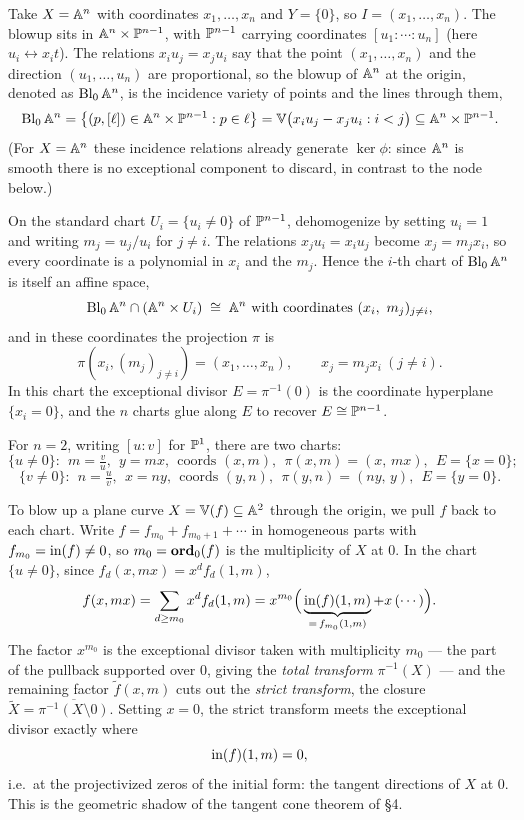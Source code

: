 \documentclass[11pt]{article}
\begin{document}
Take $X = \A^n$ with coordinates $x_1, \ldots, x_n$ and $Y = \{0\}$, so $I = (x_1, \ldots, x_n)$. The blowup sits in $\A^n \times \P^{n-1}$, with $\P^{n-1}$ carrying coordinates $[u_1 : \cdots : u_n]$ (here $u_i \leftrightarrow x_i t$). The relations $x_i u_j = x_j u_i$ say that the point $(x_1, \ldots, x_n)$ and the direction $(u_1, \ldots, u_n)$ are proportional, so the blowup of $\A^n$ at the origin, denoted as $\Bl_0 \A^n$, is the incidence variety of points and the lines through them,
\[\Bl_0 \A^n = \big\{(p, [\ell]) \in \A^n \times \P^{n-1} : p \in \ell\big\} = \V\big(x_i u_j - x_j u_i : i < j\big) \subseteq \A^n \times \P^{n-1}.\]
(For $X = \A^n$ these incidence relations already generate $\ker\phi$: since $\A^n$ is smooth there is no exceptional component to discard, in contrast to the node below.)
 
\begin{definition}\label{def:charts}
On the standard chart $U_i = \{u_i \neq 0\}$ of $\P^{n-1}$, dehomogenize by setting $u_i = 1$ and writing $m_j = u_j / u_i$ for $j \neq i$. The relations $x_j u_i = x_i u_j$ become $x_j = m_j x_i$, so every coordinate is a polynomial in $x_i$ and the $m_j$. Hence the $i$-th chart of $\Bl_0 \A^n$ is itself an affine space,
\[\Bl_0 \A^n \cap (\A^n \times U_i) \;\iso\; \A^n \text{ with coordinates } (x_i,\ m_j)_{j \neq i},\]
and in these coordinates the projection $\pi$ is
\[\pi(x_i, (m_j)_{j \neq i}) = (x_1, \ldots, x_n), \qquad x_j = m_j x_i \ (j \neq i).\]
In this chart the exceptional divisor $E = \pi^{-1}(0)$ is the coordinate hyperplane $\{x_i = 0\}$, and the $n$ charts glue along $E$ to recover $E \iso \P^{n-1}$.
\end{definition}
 
For $n = 2$, writing $[u:v]$ for $\P^1$, there are two charts:
\[
\{u \neq 0\}:\ \ m = \tfrac{v}{u},\ \ y = mx,\ \ \text{coords } (x,m),\ \ \pi(x,m) = (x,\,mx),\ \ E = \{x = 0\};
\]
\[
\{v \neq 0\}:\ \ n = \tfrac{u}{v},\ \ x = ny,\ \ \text{coords } (y,n),\ \ \pi(y,n) = (ny,\,y),\ \ E = \{y = 0\}.
\]
 
To blow up a plane curve $X = \V(f) \subseteq \A^2$ through the origin, we pull $f$ back to each chart. Write $f = f_{m_0} + f_{m_0 + 1} + \cdots$ in homogeneous parts with $f_{m_0} = \init(f) \neq 0$, so $m_0 = \ord_0(f)$ is the multiplicity of $X$ at $0$. In the chart $\{u \neq 0\}$, since $f_d(x, mx) = x^d f_d(1,m)$,
\[f(x, mx) = \sum_{d \geq m_0} x^d f_d(1,m) = x^{m_0}\Big(\underbrace{\init(f)(1,m)}_{= \, f_{m_0}(1,m)} + x\,(\cdots)\Big).\]
The factor $x^{m_0}$ is the exceptional divisor taken with multiplicity $m_0$ --- the part of the pullback supported over $0$, giving the \emph{total transform} $\pi^{-1}(X)$ --- and the remaining factor $\widetilde f(x,m)$ cuts out the \emph{strict transform}, the closure $\widetilde X = \overline{\pi^{-1}(X \setminus 0)}$. Setting $x = 0$, the strict transform meets the exceptional divisor exactly where
\[\init(f)(1,m) = 0,\]
i.e.\ at the projectivized zeros of the initial form: the tangent directions of $X$ at $0$. This is the geometric shadow of the tangent cone theorem of \S4.
 
\end{document}
